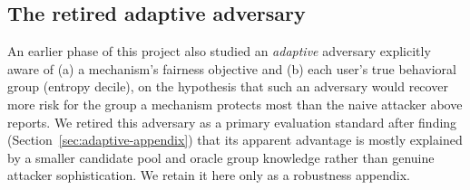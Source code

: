 \subsection{The retired adaptive adversary}
\label{sec:threat-model-adaptive}

An earlier phase of this project also studied an \emph{adaptive}
adversary explicitly aware of (a) a mechanism's fairness objective and
(b) each user's true behavioral group (entropy decile), on the
hypothesis that such an adversary would recover more risk for the
group a mechanism protects most than the naive attacker above reports.
We retired this adversary as a primary evaluation standard after
finding (Section~\ref{sec:adaptive-appendix}) that its apparent
advantage is mostly explained by a smaller candidate pool and oracle
group knowledge rather than genuine attacker sophistication. We retain
it here only as a robustness appendix.
